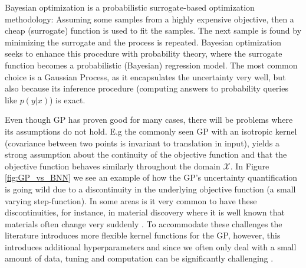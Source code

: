 Bayesian optimization is a probabilistic surrogate-based optimization methodology: Assuming some samples from a
highly expensive objective, then a cheap (surrogate) function is used to fit the samples. The next sample
is found by minimizing the surrogate and the process is repeated. Bayesian optimization seeks to
enhance this procedure with probability theory, where the surrogate function becomes a probabilistic (Bayesian)
regression model. The most common choice is a Gaussian Process, as it encapsulates the uncertainty very well,
but also because its inference procedure (computing answers to probability queries like $p(y|x)$) is exact.


Even though GP has proven good for many cases, there will be problems where its assumptions do not
hold. E.g the commonly seen GP with an isotropic kernel (covariance between two points is invariant to
translation in input), yields a strong assumption about the continuity of the objective function and that
the objective function behaves similarly throughout the domain $\mathcal{X}$. In Figure
\ref{fig:GP_vs_BNN} we see an example of how the GP's uncertainty quantification is going wild due
to a discontinuity in the underlying objective function (a small varying step-function). In some areas is it very common to have
these discontinuities, for instance, in material discovery where it is well known that materials often
change very suddenly \cite{Nature_BO_paper}. To accommodate these challenges the literature introduces more
flexible kernel functions for the GP, however, this introduces additional hyperparameters and since
we often only deal with a small amount of data, tuning and computation can be significantly challenging \cite{Nature_BO_paper}.

